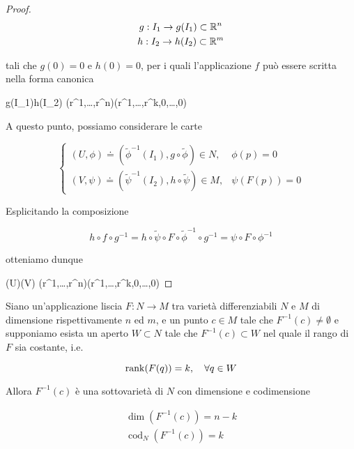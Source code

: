 \begin{proof}
	\begin{gather}
		g : I_{1} \to g(I_{1}) \subset \mathbb{R}^{n}\\
		h : I_{2} \to h(I_{2}) \subset \mathbb{R}^{m}
	\end{gather}

	tali che $ g(0) = 0 $ e $ h(0) = 0 $, per i quali l'applicazione $ f $ può essere scritta nella forma canonica
	
		{g(I_{1})}{h(I_{2})}
		{(r^{1},\dots,r^{n})}{(r^{1},\dots,r^{k},0,\dots,0)}

	A questo punto, possiamo considerare le carte
	
	\begin{equation}
		\begin{cases}
			(U,\phi) \doteq (\tilde{\phi}^{-1}(I_{1}), g \circ \tilde{\phi}) \in N, & \phi(p) = 0 \\
			(V,\psi) \doteq (\tilde{\psi}^{-1}(I_{2}), h \circ \tilde{\psi}) \in M, & \psi(F(p)) = 0
		\end{cases}
	\end{equation}
	
	Esplicitando la composizione
	
	\begin{equation}
		h \circ f \circ g^{-1} = h \circ \tilde{\psi} \circ F \circ \tilde{\phi}^{-1} \circ g^{-1} = \psi \circ F \circ \phi^{-1}
	\end{equation}

	otteniamo dunque
	
		{\phi(U)}{\psi(V)}
		{(r^{1},\dots,r^{n})}{(r^{1},\dots,r^{k},0,\dots,0)}
\end{proof}

\begin{theorem}\label{thm:preimg-rank}
	Siano un'applicazione liscia $ F : N \to M $ tra varietà differenziabili $ N $ e $ M $ di dimensione rispettivamente $ n $ ed $ m $, e un punto $ c \in M $ tale che $ F^{-1}(c) \neq \emptyset $ e supponiamo esista un aperto $ W \subset N $ tale che $ F^{-1}(c) \subset W $ nel quale il rango di $ F $ sia costante, i.e.
	
	\begin{equation}
		\rank(F(q)) = k \qcomma \forall q \in W
	\end{equation}

	Allora $ F^{-1}(c) $ è una sottovarietà di $ N $ con dimensione e codimensione
	
	\begin{gather}
		\dim(F^{-1}(c)) = n - k \\
		\operatorname{cod}_{N}(F^{-1}(c)) = k
	\end{gather}
\end{theorem}

